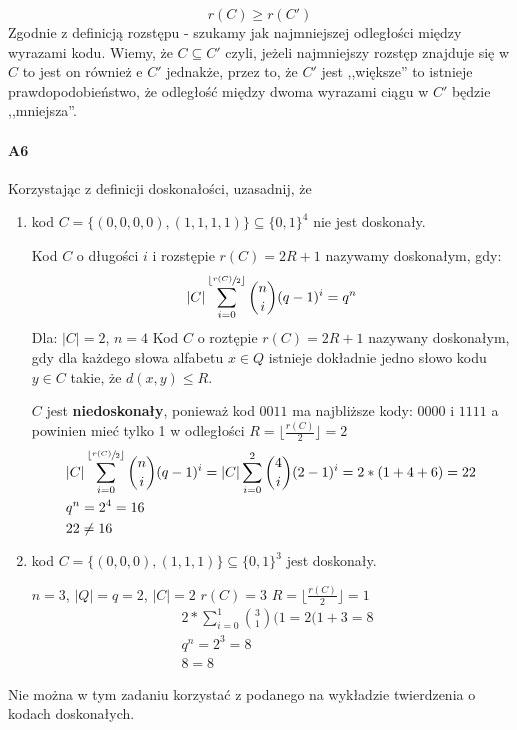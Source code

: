 \documentclass[a4paper,12pt]{article}
\newcommand\floor[1]{\lfloor#1\rfloor} %
\theoremstyle{definition}%
\theoremstyle{definition}
\theoremstyle{problem}
\begin{document}
\begin{figure}[H]
\centering
{}
\end{figure}
$$r(C)\geq r(C')$$
Zgodnie z definicją rozstępu - szukamy jak najmniejszej odległości między wyrazami kodu. Wiemy, że $C\subseteq C'$ czyli, jeżeli najmniejszy rozstęp znajduje się w $C$ to jest on również e $C'$ jednakże, przez to, że $C'$ jest ,,większe'' to istnieje prawdopodobieństwo, że odległość między dwoma wyrazami ciągu w $C'$ będzie ,,mniejsza''.
\paragraph{A6} Korzystając z definicji doskonałości, uzasadnij, że
\begin{enumerate}[label=\alph*)]
\item kod $C = \{(0, 0, 0, 0),(1, 1, 1, 1)\} \subseteq \{0, 1\}^4$ nie jest doskonały.


Kod $C$ o długości $i$ i rozstępie $r(C)=2R+1$ nazywamy doskonałym, gdy:
$$|C|\sum_{i=0}^{\floor{\sfrac{r(C)}{2}}}\binom{n}{i}(q-1)^i=q^n$$
Dla: $|C|=2$, $n=4$ Kod $C$ o roztępie $r(C)=2R+1$ nazywany doskonałym, gdy dla każdego słowa alfabetu $x\in Q$ istnieje dokładnie jedno słowo kodu $y\in C$ takie, że $d(x,y)\leq R$.

$C$ jest \textbf{niedoskonały}, ponieważ kod $0011$ ma najbliższe kody: $0000$ i $1111$ a powinien mieć tylko 1 w odległości $R=\floor{\frac{r(C)}{2}}=2$
\begin{align*}
&|C|\sum_{i=0}^{\floor{\sfrac{r(C)}{2}}}\binom{n}{i}(q-1)^i = |C|\sum_{i=0}^{2}\binom{4}{i}(2-1)^i=2*(1+4+6)=22\\
&q^n=2^4=16\\
&22\neq 16
\end{align*}
\item kod $C = \{(0, 0, 0),(1, 1, 1)\} \subseteq \{0, 1\}^3$ jest doskonały.

$n=3$, $|Q|=q=2$, $|C|=2$ $r(C)=3$ $R=\floor{\frac{r(C)}{2}}=1$
\begin{align*}
&2*\sum _{i=0}^1\binom{3}{1}(1=2(1+3=8\\
&q^n=2^3=8\\
&8=8
\end{align*}
\end{enumerate}
Nie można w tym zadaniu korzystać z podanego na wykładzie twierdzenia o kodach doskonałych.
\end{document}
